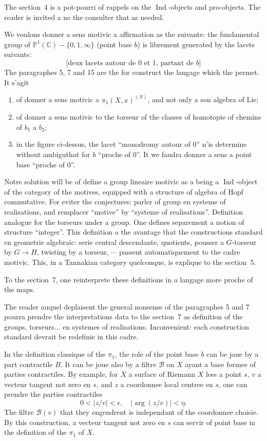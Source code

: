 \documentclass[12pt,a4paper]{article}
\theoremstyle{plain}
\theoremstyle{definition}
\theoremstyle{remark}
\DeclareMathOperator{\Ind}{Ind}
\begin{document}
The section~4 is a pot-pourri of rappels on the $\Ind$-objects and pro-objects. The reader is invited a ne the consulter that as needed.

We voulons donner a sens motivic a affirmation as the suivante: the fundamental group of $\mathbb{P}^1(\mathbb{C}) - \{0, 1, \infty\}$ (point base $b$) is librement
generated by the lacets suivants:
\begin{equation}\label{intro-lacets}
\text{[deux lacets autour de $0$ et $1$, partant de $b$]}
\end{equation}
The paragraphes 5, 7 and 15 are the for construct the langage which the permet. It s'agit
\begin{enumerate}[label=(\alph*)]
\item of donner a sens motivic a $\pi_1(X,x)^{(N)}$, and not only a son
algebra of Lie;
\item of donner a sens motivic to the torseur of the classes of homotopie of chemins of
$b_1$ a $b_2$;
\item in the figure ci-dessus, the lacet ``monodromy autour of $0$'' n'is determine
without ambigu\ite that for $b$ ``proche of $0$''. It we faudra donner a sens a point base
``proche of $0$''.
\end{enumerate}

Notre solution will be of define a group lineaire motivic as a
being a $\Ind$-object of the category of the motives, equipped with a structure of algebra
of Hopf commutative. For eviter the conjectures: parler of group en systeme of
realisations, and remplacer ``motive'' by ``systeme of realisations''.
Definition analogue for the torseurs under a group. One defines separement a
notion of structure ``integer''. This definition a the avantage that the constructions
standard en geometrie algebraic: serie central descendante, quotients, pousser a
$G$-torseur by $G \to H$, twisting by a torseur, $\cdots$ passent automatiquement to the
cadre motivic. This, in a Tannakian category quelconque, is explique to the
section~5.

To the section~7, one reinterprete these definitions in a langage more proche of the
maps.

The reader auquel deplaisent the general nonsense of the paragraphes 5 and 7 pourra prendre
the interpretations data to the section~7 as definition of the groups, torseurs$\ldots$
en systemes of realisations. Inconvenient: each construction standard devrait be
redefinie in this cadre.

In the definition classique of the $\pi_1$, the role of the point base $b$ can be joue
by a part contractile $B$. It can be joue also by a filtre $\mathcal{B}$ on $X$
ayant a base formee of parties contractiles. By example, for $X$ a surface of
Riemann $X$ less a point $s$, $v$ a vecteur tangent not zero en $s$, and $z$ a
coordonnee local centree en $s$, one can prendre the parties contractiles
\[
0 < |z/v| < \epsilon, \quad |\arg(z/v)| < \eta.
\]
The filtre $\mathcal{B}(v)$ that they engendrent is independant of the coordonnee choisie.
By this construction, a vecteur tangent not zero en $s$ can servir of point base in
the definition of the $\pi_1$ of $X$.
\end{document}
